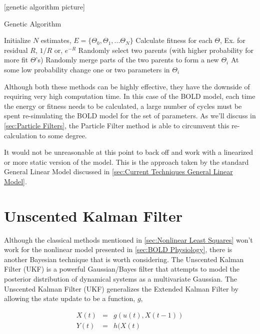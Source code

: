 [genetic algorithm picture]

\begin{algorithm}
\caption{Genetic Algorithm}
\label{alg:Genetic Algorithm}
\begin{algorithmic}
\STATE Initialize $N$ estimates, $E = \{\Theta_0, \Theta_1, ... \Theta_N\}$
    \STATE Calculate fitness for each $\Theta$, Ex. for residual $R$, $1/R$ or, $e^{-R}$
        \STATE Randomly select two parents (with higher probability for more fit $\Theta$'s)
        \STATE Randomly merge parts of the two parents to form a new $\Theta_i$
        \STATE At some low probability change one or two parameters in $\Theta_i$
    \ENDFOR
\ENDFOR
\end{algorithmic}
\end{algorithm}

Although both these methods can be highly effective, they have the downside of
requiring very high computation time. In this case of the BOLD model,
each time the energy or fitness needs to be calculated, a large number of cycles
must be spent re-simulating the BOLD model for the set of parameters. As we'll
discuss in \autoref{sec:Particle Filters}, the Particle Filter method is able
to circumvent this re-calculation to some degree.

It would not be unreasonable at this point to back off and work with a linearized
or more static version of the model. This is the approach taken by the
standard General Linear Model discussed in \autoref{sec:Current Techniques General Linear Model}.


\section{Unscented Kalman Filter}
Although the classical methods mentioned in \autoref{sec:Nonlinear Least Squares}
won't work for the nonlinear model presented in \autoref{sec:BOLD Physiology},
there is another Bayesian technique that is worth considering.
The Unscented Kalman Filter (UKF) is a powerful Gaussian/Bayes filter that attempts
to model the posterior distribution of dynamical systems as a multivariate
Gaussian. The Unscented Kalman Filter (UKF) generalizes the Extended Kalman
Filter by allowing the state update to be a function, $g$,

\begin{eqnarray}
X(t) &=& g(u(t), X(t-1))\\
Y(t) &=& h(X(t)
\end{eqnarray}


